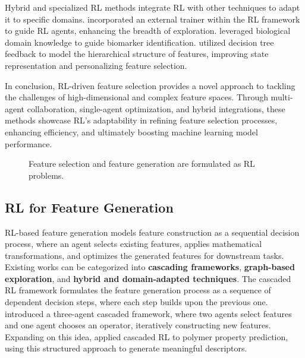 Hybrid and specialized RL methods integrate RL with other techniques to adapt it to specific domains. \cite{fan2020autofs} incorporated an external trainer within the RL framework to guide RL agents, enhancing the breadth of exploration. \cite{xiao2025} leveraged biological domain knowledge to guide biomarker identification. \cite{fan2021interactive} utilized decision tree feedback to model the hierarchical structure of features, improving state representation and personalizing feature selection.

In conclusion, RL-driven feature selection provides a novel approach to tackling the challenges of high-dimensional and complex feature spaces. Through multi-agent collaboration, single-agent optimization, and hybrid integrations, these methods showcase RL's adaptability in refining feature selection processes, enhancing efficiency, and ultimately boosting machine learning model performance.


\begin{figure}[t]
  \centering
  \hfill
  \vspace{-0.3cm}
  \caption{Feature selection and feature generation are formulated as RL problems.}
  \vspace{-0.3cm}
  \label{fig:feat}
\end{figure}

\subsection{RL for Feature Generation}
RL-based feature generation models feature construction as a sequential decision process, where an agent selects existing features, applies mathematical transformations, and optimizes the generated features for downstream tasks. Existing works can be categorized into \textbf{cascading frameworks}, \textbf{graph-based exploration}, and \textbf{hybrid and domain-adapted techniques}.
The cascaded RL framework formulates the feature generation process as a sequence of dependent decision steps, where each step builds upon the previous one.
\cite{wang2022group} introduced a three-agent cascaded framework, where two agents select features and one agent chooses an operator, iteratively constructing new features. Expanding on this idea, \cite{hu2024reinforcement} applied cascaded RL to polymer property prediction, using this structured approach to generate meaningful descriptors.

